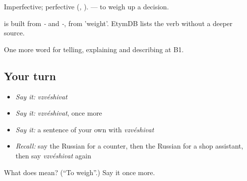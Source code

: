 Imperfective; perfective \emph{} (\emph{, }). \emph{ } — to weigh up a decision.

\begin{cousinweb}
\emph{} is built from \emph{-} and \emph{-}, from \emph{} 'weight'. EtymDB lists the verb without a deeper source.
\end{cousinweb}

\begin{grammarlens}[title={What you've built}]
One more word for telling, explaining and describing at B1.
\end{grammarlens}

\subsection*{Your turn}
\begin{itemize}
\raggedright
  \item \emph{Say it:} \emph{vzvéshivat}
  \item \emph{Say it:} \emph{vzvéshivat}, once more
  \item \emph{Say it:} a sentence of your own with \emph{vzvéshivat}
  \item \emph{Recall:} say the Russian for a counter, then the Russian for a shop assistant, then say \emph{vzvéshivat} again
\end{itemize}

\begin{tcolorbox}[breakable,colback=teal!4,colframe=teal!35!black,title={Before you move on}]
What does  mean? (\textquotedblleft{}To weigh\textquotedblright{}.) Say it once more.
\end{tcolorbox}
